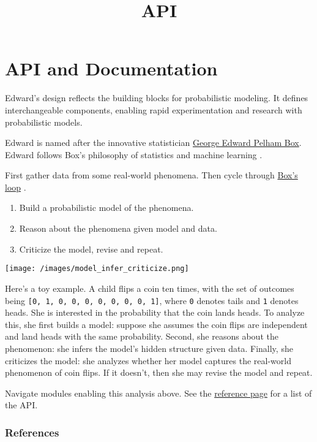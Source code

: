 \title{API}

\section{API and Documentation}

Edward's design reflects the building blocks for probabilistic
modeling. It defines interchangeable components, enabling rapid
experimentation and research with probabilistic models.

Edward is named after the innovative statistician
\href{https://en.wikipedia.org/wiki/George_E._P._Box}{George Edward
Pelham Box}. Edward follows Box's philosophy of statistics and machine
learning \citep{box1976science}.

First gather data from some real-world phenomena. Then cycle through
\href{http://www.annualreviews.org/eprint/7xbyci3nwAg5kEttvvjk/full/10.1146/annurev-statistics-022513-115657}
{Box's loop} \citep{blei2014build}.

\begin{enumerate}
\item Build a probabilistic model of the phenomena.
\item Reason about the phenomena given model and data.
\item Criticize the model, revise and repeat.
\end{enumerate}

\texttt{[image: /images/model\_infer\_criticize.png]}

Here's a toy example. A child flips a coin ten times, with the set of outcomes
being \texttt{{[}0,\ 1,\ 0,\ 0,\ 0,\ 0,\ 0,\ 0,\ 0,\ 1{]}}, where \texttt{0}
denotes tails and \texttt{1} denotes heads. She is interested in the
probability that the coin lands heads. To analyze this, she first
builds a model: suppose she assumes the coin flips are independent and
land heads with the same probability. Second, she reasons about the
phenomenon: she infers the model's hidden structure given data.
Finally, she criticizes the model: she analyzes whether her model
captures the real-world phenomenon of coin flips. If it doesn't, then
she may revise the model and repeat.

Navigate modules enabling this analysis above.
See the
\href{/api/ed}{reference page} for a list of the API.

\subsubsection{References}\label{references}
